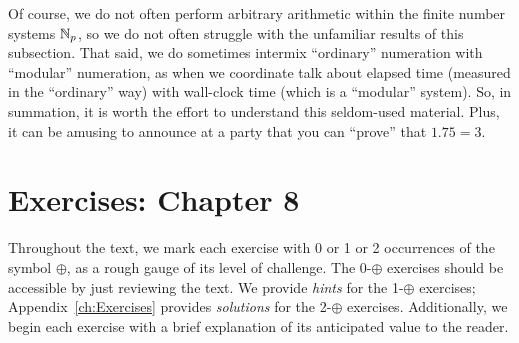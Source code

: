 \medskip

Of course, we do not often perform arbitrary arithmetic within the finite number systems $\mathbb{N}_p$, so we do not often struggle with the unfamiliar results of this subsection.  That said, we do sometimes intermix ``ordinary'' numeration with ``modular'' numeration, as when we coordinate talk about elapsed time (measured in the ``ordinary'' way) with wall-clock time (which is a ``modular'' system).  So, in summation, it is worth the effort to understand this seldom-used material.  Plus, it can be amusing to announce at a party that you can ``prove'' that $1.75 = 3$.




\section{Exercises: Chapter 8}
\label{sec:EX-NUM2}

Throughout the text, we mark each exercise with 0 or 1 or 2 occurrences of the symbol $\oplus$, as a rough gauge of its level of challenge.  The 0-$\oplus$ exercises should be accessible by just reviewing the text.  We provide {\em hints} for the 1-$\oplus$ exercises; Appendix~\ref{ch:Exercises} provides {\em solutions} for the 2-$\oplus$ exercises.  Additionally, we begin each exercise with a brief explanation of its anticipated value to the reader.
 


